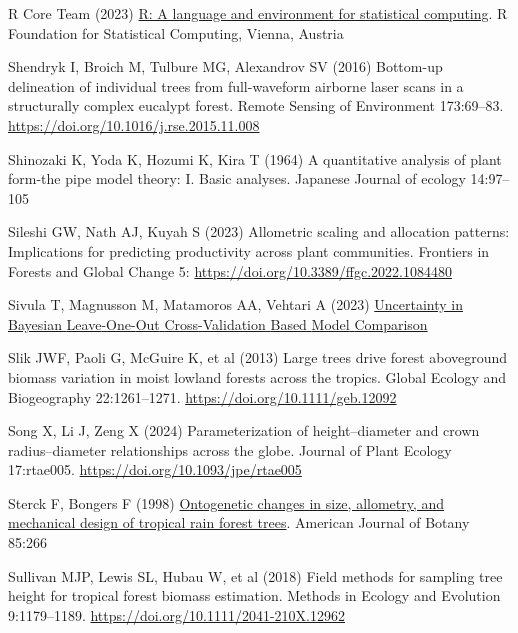 \documentclass[
  12pt,
  letterpaper,
  DIV=11,
  numbers=noendperiod]{scrartcl}
\newlength{\cslhangindent}
\newlength{\cslentryspacingunit} %
\newenvironment{CSLReferences}[2] %
 {%
  \setlength{\parindent}{0pt}
  \ifodd #1
  \let\oldpar\par
  \def\par{\hangindent=\cslhangindent\oldpar}
  \fi
  \setlength{\parskip}{#2\cslentryspacingunit}
 }%
 {}
\begin{document}
\begin{CSLReferences}{1}{0}
\leavevmode{}%
R Core Team (2023) \href{https://www.R-project.org/}{R: A language and
environment for statistical computing}. R Foundation for Statistical
Computing, Vienna, Austria

\leavevmode{}%
Shendryk I, Broich M, Tulbure MG, Alexandrov SV (2016) Bottom-up
delineation of individual trees from full-waveform airborne laser scans
in a structurally complex eucalypt forest. Remote Sensing of Environment
173:69--83. \url{https://doi.org/10.1016/j.rse.2015.11.008}

\leavevmode{}%
Shinozaki K, Yoda K, Hozumi K, Kira T (1964) A quantitative analysis of
plant form-the pipe model theory: I. Basic analyses. Japanese Journal of
ecology 14:97--105

\leavevmode{}%
Sileshi GW, Nath AJ, Kuyah S (2023) Allometric scaling and allocation
patterns: {Implications} for predicting productivity across plant
communities. Frontiers in Forests and Global Change 5:
\url{https://doi.org/10.3389/ffgc.2022.1084480}

\leavevmode{}%
Sivula T, Magnusson M, Matamoros AA, Vehtari A (2023)
\href{https://doi.org/10.48550/arXiv.2008.10296}{Uncertainty in
{Bayesian} {Leave}-{One}-{Out} {Cross}-{Validation} {Based} {Model}
{Comparison}}

\leavevmode{}%
Slik JWF, Paoli G, McGuire K, et al (2013) Large trees drive forest
aboveground biomass variation in moist lowland forests across the
tropics. Global Ecology and Biogeography 22:1261--1271.
\url{https://doi.org/10.1111/geb.12092}

\leavevmode{}%
Song X, Li J, Zeng X (2024) Parameterization of height--diameter and
crown radius--diameter relationships across the globe. Journal of Plant
Ecology 17:rtae005. \url{https://doi.org/10.1093/jpe/rtae005}

\leavevmode{}%
Sterck F, Bongers F (1998)
\href{https://www.ncbi.nlm.nih.gov/pubmed/21684910}{Ontogenetic changes
in size, allometry, and mechanical design of tropical rain forest
trees}. American Journal of Botany 85:266

\leavevmode{}%
Sullivan MJP, Lewis SL, Hubau W, et al (2018) Field methods for sampling
tree height for tropical forest biomass estimation. Methods in Ecology
and Evolution 9:1179--1189.
\url{https://doi.org/10.1111/2041-210X.12962}


\end{CSLReferences}
\end{document}
